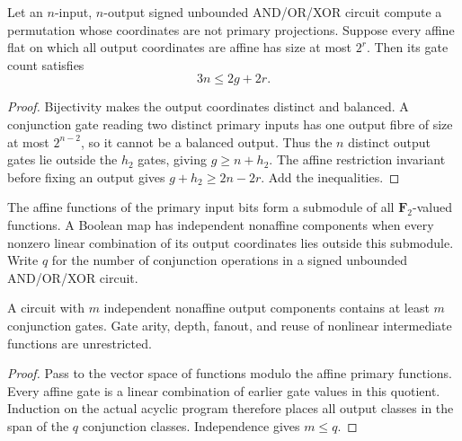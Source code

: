 \begin{theorem}
  \label{thm:lowerbounds-algebraic-geometry-multioutput}
  \leanok
  Let an $n$-input, $n$-output signed unbounded AND/OR/XOR circuit compute
  a permutation whose coordinates are not primary projections. Suppose every
  affine flat on which all output coordinates are affine has size at most
  $2^r$. Then its gate count satisfies
  \[
    3n\le 2g+2r.
  \]
\end{theorem}
\begin{proof}
  \leanok
  Bijectivity makes the output coordinates distinct and balanced. A conjunction
  gate reading two distinct primary inputs has one output fibre of size at most
  $2^{n-2}$, so it cannot be a balanced output. Thus the $n$ distinct output
  gates lie outside the $h_2$ gates, giving $g\ge n+h_2$. The affine restriction
  invariant before fixing an output gives $g+h_2\ge2n-2r$. Add the inequalities.
\end{proof}

\begin{definition}
  \label{def:lowerbounds-algebraic-geometry-nonlinear-rank}
  \leanok
  The affine functions of the primary input bits form a submodule of all
  $\mathbf F_2$-valued functions. A Boolean map has independent nonaffine
  components when every nonzero linear combination of its output coordinates
  lies outside this submodule. Write $q$ for the number of conjunction operations
  in a signed unbounded AND/OR/XOR circuit.
\end{definition}

\begin{theorem}
  \label{thm:lowerbounds-algebraic-geometry-nonlinear-rank}
  \leanok
  A circuit with $m$ independent nonaffine output components contains at least
  $m$ conjunction gates. Gate arity, depth, fanout, and reuse of nonlinear
  intermediate functions are unrestricted.
\end{theorem}
\begin{proof}
  \leanok
  Pass to the vector space of functions modulo the affine primary functions.
  Every affine gate is a linear combination of earlier gate values in this
  quotient. Induction on the actual acyclic program therefore places all output
  classes in the span of the $q$ conjunction classes. Independence gives $m\le q$.
\end{proof}

